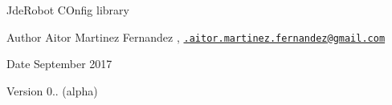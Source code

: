 Jde\+Robot C\+Onfig library

\begin{DoxyAuthor}{Author}
Aitor Martinez Fernandez , \href{mailto:.aitor.martinez.fernandez@gmail.com}{\tt .\+aitor.\+martinez.\+fernandez@gmail.\+com} 
\end{DoxyAuthor}
\begin{DoxyDate}{Date}
September 2017 
\end{DoxyDate}
\begin{DoxyVersion}{Version}
0.. (alpha) 
\end{DoxyVersion}
